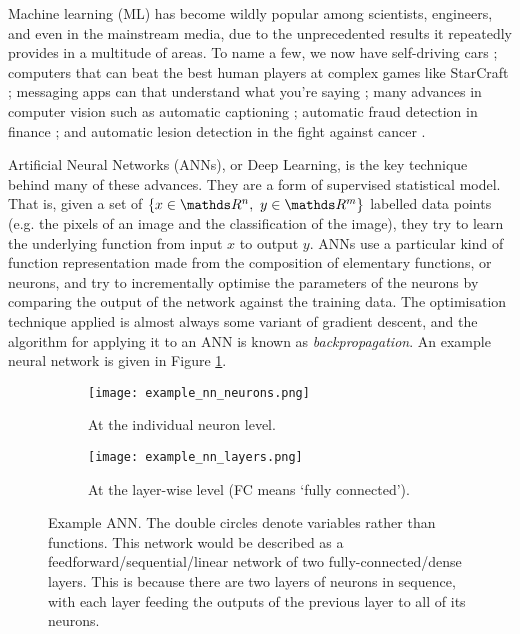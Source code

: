 Machine learning (ML) has become wildly popular among scientists, engineers, and even in the mainstream media, due to the unprecedented results it repeatedly provides in a multitude of areas. To name a few, we now have self-driving cars \cite{Fridman2019}; computers that can beat the best human players at complex games like StarCraft \cite{Vinyals2017}; messaging apps can that understand what you're saying \cite{Abdulkader2016, NIPS2015_5782}; many advances in computer vision such as automatic captioning \cite{Karpathy2017}; automatic fraud detection in finance \cite{DalPozzolo2015}; and automatic lesion detection in the fight against cancer \cite{Zlocha2019}.

Artificial Neural Networks (ANNs), or Deep Learning, is the key technique behind many of these advances. They are a form of supervised statistical model. That is, given a set of \(\{x \in \R^n, \ y \in \R^m\}\) labelled data points (e.g. the pixels of an image and the classification of the image), they try to learn the underlying function from input \(x\) to output \(y\). ANNs use a particular kind of function representation made from the composition of elementary functions, or neurons, and try to incrementally optimise the parameters of the neurons by comparing the output of the network against the training data. The optimisation technique applied is almost always some variant of gradient descent, and the algorithm for applying it to an ANN is known as \textit{backpropagation}. An example neural network is given in Figure \ref{fig:1-example-net}.

\begin{figure}[h!]
    \centering
    \hspace{0.5cm}
    \begin{subfigure}[]{0.4\textwidth}
        \centering
        \texttt{[image: example\_nn\_neurons.png]}
        \caption{At the individual neuron level.}
    \end{subfigure}
    \hfill
    \begin{subfigure}[]{0.4\textwidth}
        \centering
        \texttt{[image: example\_nn\_layers.png]}
        \caption{At the layer-wise level (FC means `fully connected').}
    \end{subfigure}%
    \hspace{0.5cm}
    \caption{Example ANN. The double circles denote variables rather than functions. This network would be described as a feedforward/sequential/linear network of two fully-connected/dense layers. This is because there are two layers of neurons in sequence, with each layer feeding the outputs of the previous layer to all of its neurons.}
    \label{fig:1-example-net}
\end{figure}

